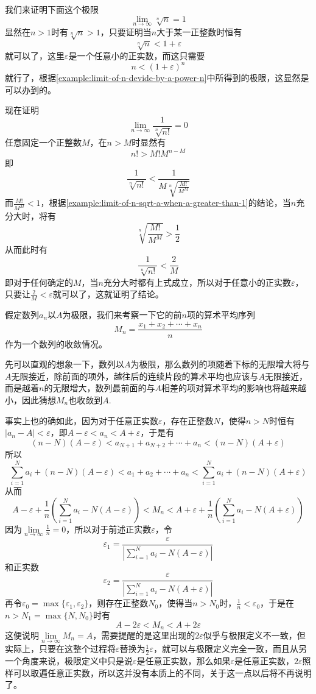 \begin{example}
  我们来证明下面这个极限
  \[ \lim_{n \to \infty} \sqrt[n]{n} = 1 \]
  显然在$n>1$时有$\sqrt[n]{n}>1$，只要证明当$n$大于某一正整数时恒有
  \[ \sqrt[n]{n}<1+\varepsilon \]
  就可以了，这里$\varepsilon$是一个任意小的正实数，而这只需要
  \[ n < (1+\varepsilon)^n \]
  就行了，根据\autoref{example:limit-of-n-devide-by-a-power-n}中所得到的极限，这显然是可以办到的。
\end{example}

\begin{example}
  现在证明
  \[ \lim_{n \to \infty} \frac{1}{\sqrt[n]{n!}} = 0 \]
  任意固定一个正整数$M$，在$n>M$时显然有
  \[ n!>M!M^{n-M} \]
  即
  \[ \frac{1}{\sqrt[n]{n!}} < \frac{1}{M \sqrt[n]{\frac{M!}{M^M}}} \]
  而$\frac{M!}{M^M}<1$，根据\autoref{example:limit-of-n-sqrt-a-when-a-greater-than-1}的结论，当$n$充分大时，将有
  \[ \sqrt[n]{\frac{M!}{M^M}} > \frac{1}{2} \]
  从而此时有
  \[ \frac{1}{\sqrt[n]{n!}} < \frac{2}{M} \]
  即对于任何确定的$M$，当$n$充分大时都有上式成立，所以对于任意小的正实数$\varepsilon$，只要让$\frac{2}{M}<\varepsilon$就可以了，这就证明了结论。
\end{example}

\begin{example}
  \label{example:mean-value-of-converge-number-sequence}
  假定数列$a_n$以$A$为极限，我们来考察一下它的前$n$项的算术平均序列
  \[ M_n=\frac{x_1+x_2+\cdots+x_n}{n} \]
  作为一个数列的收敛情况。

  先可以直观的想象一下，数列以$A$为极限，那么数列的项随着下标的无限增大将与$A$无限接近，除前面的项外，越往后的连续片段的算术平均也应该与$A$无限接近，而是越着$n$的无限增大，数列最前面的与$A$相差的项对算术平均的影响也将越来越小，因此猜想$M_n$也收敛到$A$.

  事实上也的确如此，因为对于任意正实数$\varepsilon$，存在正整数$N$，使得$n>N$时恒有$|a_n-A|<\varepsilon$，即$A-\varepsilon<a_n<A+\varepsilon$，于是有
  \[ (n-N)(A-\varepsilon) < a_{N+1}+a_{N+2}+\cdots+a_n < (n-N)(A+\varepsilon) \]
  所以
  \[ \sum_{i=1}^Na_i + (n-N)(A-\varepsilon) < a_{1}+a_{2}+\cdots+a_n < \sum_{i=1}^Na_i + (n-N)(A+\varepsilon) \]
  从而
  \[ A-\varepsilon + \frac{1}{n} \left( \sum_{i=1}^Na_i - N(A-\varepsilon) \right) < M_n <  A+\varepsilon + \frac{1}{n} \left( \sum_{i=1}^Na_i - N(A+\varepsilon) \right)\]
  因为$\lim\limits_{n \to \infty}\frac{1}{n} = 0$，所以对于前述正实数$\varepsilon$，令
  \[ \varepsilon_1= \frac{\varepsilon}{\left| \sum_{i=1}^Na_i - N(A-\varepsilon) \right|} \]
  和正实数
  \[ \varepsilon_2= \frac{\varepsilon}{\left| \sum_{i=1}^Na_i - N(A+\varepsilon) \right|} \]
  再令$\varepsilon_0=\max\{\varepsilon_1,\varepsilon_2\}$，则存在正整数$N_0$，使得当$n>N_0$时，$\frac{1}{n}<\varepsilon_0$，于是在$n>N_1=\max\{N,N_0\}$时有
  \[ A-2\varepsilon < M_n < A+2\varepsilon \]
  这便说明$\lim\limits_{n \to \infty}M_n = A$，需要提醒的是这里出现的$2\varepsilon$似乎与极限定义不一致，但实际上，只要在这整个过程将$\varepsilon$替换为$\frac{1}{2}\varepsilon$，就可以与极限定义完全一致，而且从另一个角度来说，极限定义中只是说$\varepsilon$是任意正实数，那么如果$\varepsilon$是任意正实数，$2\varepsilon$照样可以取遍任意正实数，所以这并没有本质上的不同，关于这一点以后将不再说明了。
\end{example}

